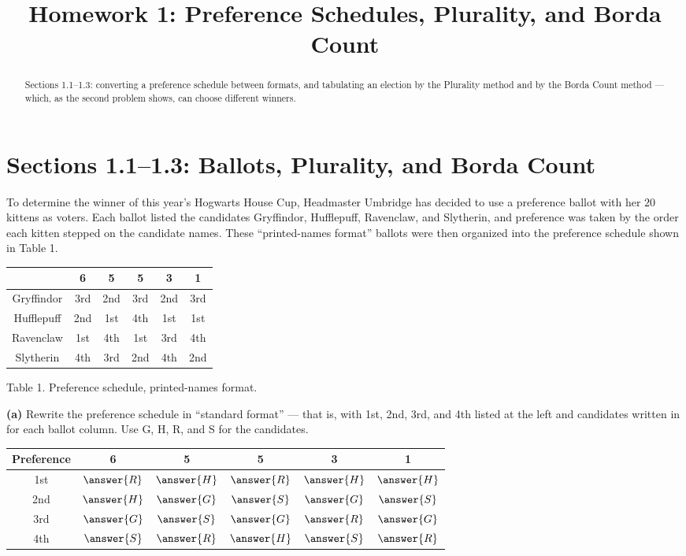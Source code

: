 \documentclass[12pt]{ximera}
\title{Homework 1: Preference Schedules, Plurality, and Borda Count}
\begin{document}
\begin{abstract}
Sections 1.1--1.3: converting a preference schedule between formats, and tabulating an
election by the Plurality method and by the Borda Count method --- which, as the second
problem shows, can choose different winners.
\end{abstract}
\maketitle

\section*{Sections 1.1--1.3: Ballots, Plurality, and Borda Count}

\begin{problem}
To determine the winner of this year's Hogwarts House Cup, Headmaster Umbridge has
decided to use a preference ballot with her $20$ kittens as voters. Each ballot listed
the candidates Gryffindor, Hufflepuff, Ravenclaw, and Slytherin, and preference was
taken by the order each kitten stepped on the candidate names. These
``printed-names format'' ballots were then organized into the preference schedule
shown in Table 1.

\begin{center}
\begin{tabular}{c|ccccc}
 & 6 & 5 & 5 & 3 & 1 \\\hline
Gryffindor & 3rd & 2nd & 3rd & 2nd & 3rd \\
Hufflepuff & 2nd & 1st & 4th & 1st & 1st \\
Ravenclaw  & 1st & 4th & 1st & 3rd & 4th \\
Slytherin  & 4th & 3rd & 2nd & 4th & 2nd
\end{tabular}

\smallskip
Table 1. Preference schedule, printed-names format.
\end{center}

\begin{prompt}
\textbf{(a)} Rewrite the preference schedule in ``standard format'' --- that is, with
1st, 2nd, 3rd, and 4th listed at the left and candidates written in for each ballot
column. Use G, H, R, and S for the candidates.

\begin{center}
\begin{tabular}{c|ccccc}
Preference & 6 & 5 & 5 & 3 & 1 \\\hline
1st & $\answer{R}$ & $\answer{H}$ & $\answer{R}$ & $\answer{H}$ & $\answer{H}$ \\
2nd & $\answer{H}$ & $\answer{G}$ & $\answer{S}$ & $\answer{G}$ & $\answer{S}$ \\
3rd & $\answer{G}$ & $\answer{S}$ & $\answer{G}$ & $\answer{R}$ & $\answer{G}$ \\
4th & $\answer{S}$ & $\answer{R}$ & $\answer{H}$ & $\answer{S}$ & $\answer{R}$
\end{tabular}
\end{center}


\end{prompt}
\end{problem}
\end{document}
